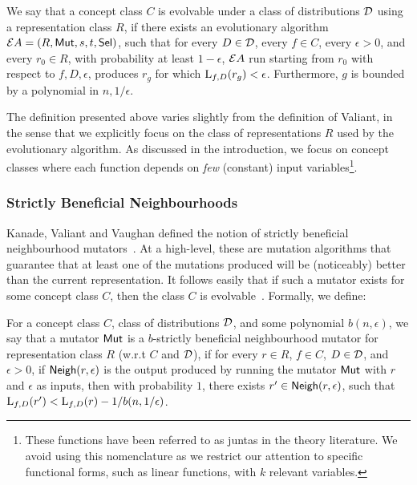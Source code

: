 \begin{definition} We say that a
concept class $C$ is evolvable under a class of distributions ${\mathcal D}$ using a
representation class $R$, if there exists an evolutionary algorithm ${\mathcal EA} =
(R, \mathsf{Mut}, s, t, \mathsf{Sel})$, such that for every $D \in {\mathcal D}$, every $f \in C$,
every $\epsilon > 0$, and every $r_0 \in R$, with probability at least $1 -
\epsilon$, ${\mathcal EA}$ run starting from $r_0$ with respect to $f, D, \epsilon$,
produces $r_g$ for which $\mathrm{L}_{f, D}(r_g) < \epsilon$. Furthermore, $g$ is
bounded by a polynomial in $n, 1/\epsilon$.  \end{definition}

The definition presented above varies slightly from the definition of Valiant,
in the sense that we explicitly focus on the class of representations $R$ used
by the evolutionary algorithm. As discussed in the introduction, we focus on
concept classes where each function depends on \emph{few} (constant) input
variables\footnote{These functions have been referred to as juntas in the theory
literature. We avoid using this nomenclature as we restrict our attention to
specific functional forms, such as linear functions, with $k$ relevant
variables.}. 

\subsubsection{Strictly Beneficial Neighbourhoods}

Kanade, Valiant and Vaughan defined the notion of strictly beneficial
neighbourhood mutators~\cite{KVV:2010-drift}. At a high-level, these are
mutation algorithms that guarantee that at least one of the mutations produced
will be (noticeably) better than the current representation. It follows easily
that if such a mutator exists for some concept class $C$, then the class $C$ is
evolvable~\cite{KVV:2010-drift}. Formally, we define:

\begin{definition} For a concept
class $C$, class of distributions ${\mathcal D}$, and some polynomial $b(n,
\epsilon)$, we say that a mutator $\mathsf{Mut}$ is a $b$-strictly beneficial
neighbourhood mutator for representation class $R$ (w.r.t $C$ and ${\mathcal D}$), if
for every $r \in R$, $f \in C$, $D \in {\mathcal D}$, and $\epsilon > 0$, if
$\mathsf{Neigh}(r, \epsilon)$ is the output produced by running the mutator $\mathsf{Mut}$ with
$r$ and $\epsilon$ as inputs, then with probability $1$, there exists $r^\prime
\in \mathsf{Neigh}(r, \epsilon)$, such that $\mathrm{L}_{f, D}(r^\prime) < \mathrm{L}_{f, D}(r) -
1/b(n, 1/\epsilon)$.  \end{definition}

